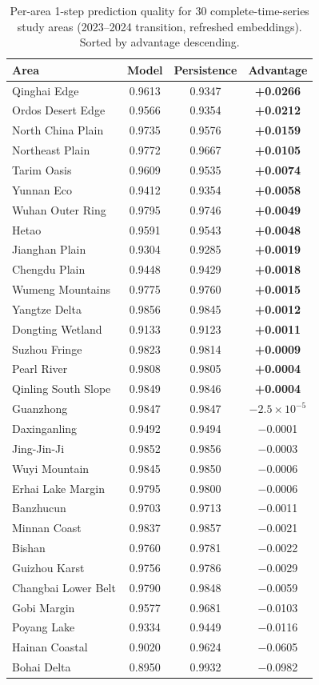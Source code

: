 \documentclass{article}
\begin{document}
\begin{table}[htbp]
\centering
\caption{Per-area 1-step prediction quality for 30 complete-time-series study areas (2023--2024 transition, refreshed embeddings). Sorted by advantage descending.}
\label{tab:perarea}
\small
\begin{tabular}{lccc}
\toprule
Area & Model & Persistence & Advantage \\
\midrule
Qinghai Edge & 0.9613 & 0.9347 & \textbf{+0.0266} \\
Ordos Desert Edge & 0.9566 & 0.9354 & \textbf{+0.0212} \\
North China Plain & 0.9735 & 0.9576 & \textbf{+0.0159} \\
Northeast Plain & 0.9772 & 0.9667 & \textbf{+0.0105} \\
Tarim Oasis & 0.9609 & 0.9535 & \textbf{+0.0074} \\
Yunnan Eco & 0.9412 & 0.9354 & \textbf{+0.0058} \\
Wuhan Outer Ring & 0.9795 & 0.9746 & \textbf{+0.0049} \\
Hetao & 0.9591 & 0.9543 & \textbf{+0.0048} \\
Jianghan Plain & 0.9304 & 0.9285 & \textbf{+0.0019} \\
Chengdu Plain & 0.9448 & 0.9429 & \textbf{+0.0018} \\
Wumeng Mountains & 0.9775 & 0.9760 & \textbf{+0.0015} \\
Yangtze Delta & 0.9856 & 0.9845 & \textbf{+0.0012} \\
Dongting Wetland & 0.9133 & 0.9123 & \textbf{+0.0011} \\
Suzhou Fringe & 0.9823 & 0.9814 & \textbf{+0.0009} \\
Pearl River & 0.9808 & 0.9805 & \textbf{+0.0004} \\
Qinling South Slope & 0.9849 & 0.9846 & \textbf{+0.0004} \\
Guanzhong & 0.9847 & 0.9847 & $-2.5\times10^{-5}$ \\
Daxinganling & 0.9492 & 0.9494 & $-$0.0001 \\
Jing-Jin-Ji & 0.9852 & 0.9856 & $-$0.0003 \\
Wuyi Mountain & 0.9845 & 0.9850 & $-$0.0006 \\
Erhai Lake Margin & 0.9795 & 0.9800 & $-$0.0006 \\
Banzhucun & 0.9703 & 0.9713 & $-$0.0011 \\
Minnan Coast & 0.9837 & 0.9857 & $-$0.0021 \\
Bishan & 0.9760 & 0.9781 & $-$0.0022 \\
Guizhou Karst & 0.9756 & 0.9786 & $-$0.0029 \\
Changbai Lower Belt & 0.9790 & 0.9848 & $-$0.0059 \\
Gobi Margin & 0.9577 & 0.9681 & $-$0.0103 \\
Poyang Lake & 0.9334 & 0.9449 & $-$0.0116 \\
Hainan Coastal & 0.9020 & 0.9624 & $-$0.0605 \\
Bohai Delta & 0.8950 & 0.9932 & $-$0.0982 \\
\bottomrule
\end{tabular}
\end{table}
\end{document}
